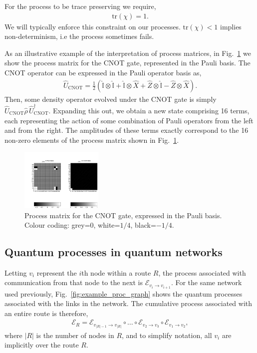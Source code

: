 For the process to be trace preserving we require,
\begin{align}
\text{tr}(\chi) = 1.
\end{align}
We will typically enforce this constraint on our processes. $\text{tr}(\chi) < 1$ implies non-determinism, i.e the process sometimes fails. 

As an illustrative example of the interpretation of process matrices, in Fig.~\ref{fig:CNOT_proc_matrix} we show the process matrix for the CNOT gate, represented in the Pauli basis. The CNOT operator can be expressed in the Pauli operator basis as,
\begin{align}
\hat{U}_\text{CNOT} = \frac{1}{2}(\hat{\mathbb{I}}\otimes \hat{\mathbb{I}} + \hat{\mathbb{I}} \otimes \hat{X} + \hat{Z}\otimes \hat{\mathbb{I}} - \hat{Z}\otimes \hat{X}).
\end{align}
Then, some density operator evolved under the CNOT gate is simply \mbox{$\hat{U}_\text{CNOT}\hat\rho \,\hat{U}_\text{CNOT}^\dag$}. Expanding this out, we obtain a new state comprising 16 terms, each representing the action of some combination of Pauli operators from the left and from the right. The amplitudes of these terms exactly correspond to the 16 non-zero elements of the process matrix shown in Fig.~\ref{fig:CNOT_proc_matrix}.

\begin{figure}[!htb]
\includegraphics[width=0.35\textwidth]{CNOT_process}
\caption{Process matrix for the CNOT gate, expressed in the Pauli basis. Colour coding: grey=0, white=$1/4$, black=$-1/4$.} \label{fig:CNOT_proc_matrix}
\end{figure}

%
%

\subsection{Quantum processes in quantum networks} \label{sec:quant_proc_in} 

Letting $v_i$ represent the $i$th node within a route $R$, the process associated with communication from that node to the next is $\mathcal{E}_{v_i\to v_{i+1}}$. For the same network used previously, Fig.~\ref{fig:example_proc_graph} shows the quantum processes associated with the links in the network. The cumulative process associated with an entire route is therefore,
\begin{align}
\mathcal{E}_R = \mathcal{E}_{{v_{|R|-1}}\to v_{|R|}} \circ \dots \circ \mathcal{E}_{v_2\to v_3} \circ \mathcal{E}_{v_1\to v_2},
\end{align}
where $|R|$ is the number of nodes in $R$, and to simplify notation, all $v_i$ are implicitly over the route $R$.


